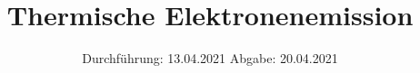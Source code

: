 

\subject{V504}
\title{Thermische Elektronenemission}
\date{%
  Durchführung: 13.04.2021
  \hspace{3em}
  Abgabe: 20.04.2021
}



\maketitle
\thispagestyle{empty}
\tableofcontents
\newpage





\nocite{*}
\printbibliography{}


